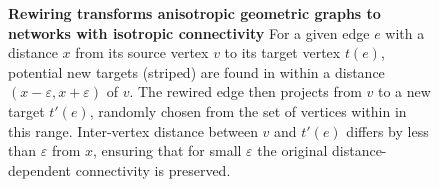 \vspace{0.2cm}
\begin{figure}[H]
  \centering 
  \caption{\textbf{Rewiring transforms anisotropic geometric graphs to
      networks with isotropic connectivity} For a given edge $e$ with
    a distance $x$ from its source vertex $v$ to its target vertex
    $t(e)$, potential new targets (striped) are found in within a
    distance $(x-\varepsilon, x+\varepsilon)$ of $v$. The rewired edge
    then projects from $v$ to a new target $t'(e)$, randomly chosen
    from the set of vertices within in this range. Inter-vertex
    distance between $v$ and $t'(e)$ differs by less than
    $\varepsilon$ from $x$, ensuring that for small $\varepsilon$ the
    original distance-dependent connectivity is preserved.}
  \label{fig:distance_rewiring}
\end{figure}

 




